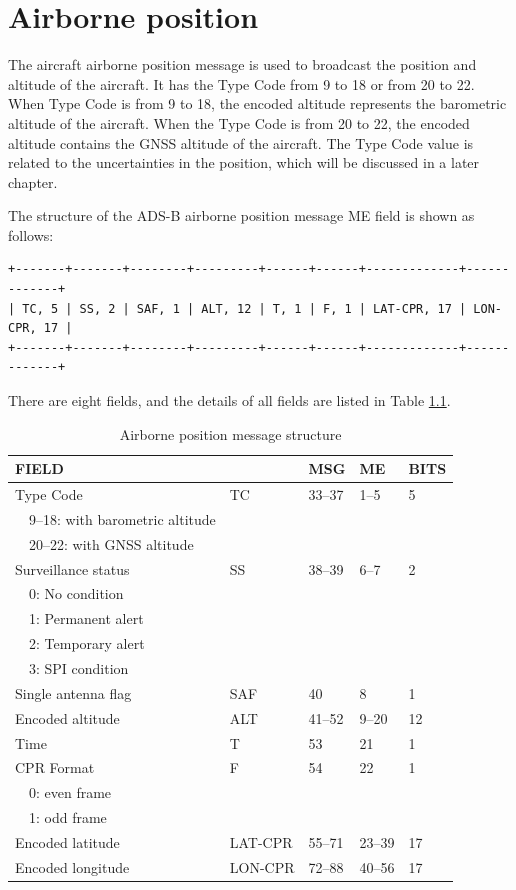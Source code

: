 \chapter{Airborne position} \label{chap:airborn-position}

The aircraft airborne position message is used to broadcast the position and altitude of the aircraft. It has the Type Code from 9 to 18 or from 20 to 22. When Type Code is from 9 to 18, the encoded altitude represents the barometric altitude of the aircraft. When the Type Code is from 20 to 22, the encoded altitude contains the GNSS altitude of the aircraft. The Type Code value is related to the uncertainties in the position, which will be discussed in a later chapter.

The structure of the ADS-B airborne position message ME field is shown as follows:

\begin{verbatim}
+-------+-------+--------+---------+------+------+-------------+-------------+
| TC, 5 | SS, 2 | SAF, 1 | ALT, 12 | T, 1 | F, 1 | LAT-CPR, 17 | LON-CPR, 17 |
+-------+-------+--------+---------+------+------+-------------+-------------+
\end{verbatim}

There are eight fields, and the details of all fields are listed in Table \ref{tb:adsb-air-pos-fields}.

\begin{table}[ht]
\caption{Airborne position message structure}
\label{tb:adsb-air-pos-fields}
\begin{tabular}{|l|l|l|l|l|}
\hline
\textbf{FIELD} & \textbf{} & \textbf{MSG} & \textbf{ME} & \textbf{BITS} \\ \hline
Type Code  & TC & 33--37 & 1--5 & 5 \\ 
~~9--18: with barometric altitude  & & & &\\ 
~~20--22: with GNSS altitude  & & & &\\ \hline
Surveillance status  & SS & 38--39 & 6--7 & 2\\
~~0: No condition & & & &\\ 
~~1: Permanent alert & & & &\\ 
~~2: Temporary alert & & & &\\ 
~~3: SPI condition & & & & \\ \hline
Single antenna flag & SAF & 40 & 8 & 1 \\ \hline
Encoded altitude & ALT & 41--52 & 9--20 & 12 \\ \hline
Time & T & 53 & 21 & 1 \\ \hline
CPR Format  & F & 54 & 22 & 1 \\
~~0: even frame & & & &\\
~~1: odd frame  & & & &\\ \hline
Encoded latitude & LAT-CPR & 55--71 & 23--39 & 17 \\ \hline
Encoded longitude & LON-CPR & 72--88 & 40--56 & 17 \\ \hline
\end{tabular}
\end{table}

